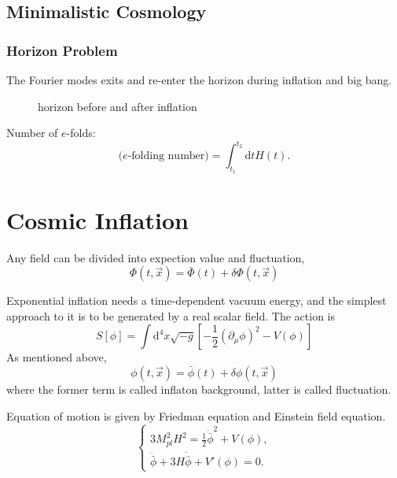 \section{Minimalistic Cosmology}
\subsection{Horizon Problem}
The Fourier modes exits and re-enter the horizon during inflation and big bang.
\begin{figure}[ht]
    \centering
    \caption{horizon before and after inflation}
    \label{fig:horizon-before-and-after-inflation}
\end{figure}

Number of $e$-folds:
\begin{equation}
  \text{($e$-folding number)} = \int _{t_1}^{t_2}\mathrm{d} t H(t).
\end{equation}

\chapter{Cosmic Inflation}

Any field can be divided into expection value and fluctuation,
\begin{equation}
  \Phi(t,\vec{x}) = \bar{\Phi}(t) + \delta\Phi (t,\vec{x})
\end{equation}

Exponential inflation needs a time-dependent vacuum energy, and the simplest approach to it is to be generated by a real scalar field.
The action is
\begin{equation}
  S[\phi] = \int \mathrm{d} ^{4} x \sqrt{-g} \left[ - \frac{1}{2} \left( \partial_{\mu }\phi  \right)^{2} - V(\phi ) \right]
\end{equation}
As mentioned above, 
\begin{equation}
  \phi (t,\vec{x}) = \bar{\phi}(t) + \delta\phi(t,\vec{x})
\end{equation}
where the former term is called inflaton background, latter is called fluctuation.

Equation of motion is given by Friedman equation and Einstein field equation.
\begin{equation}
  \begin{cases}
    3 M_{pl}^{2} H^{2} = \frac{1}{2} \dot{\bar{\phi}}^{2} + V(\phi ), \\
    \ddot{\bar{\phi}} + 3H \dot{\bar{\phi}} + V'(\phi ) = 0.
  \end{cases}
\end{equation}

